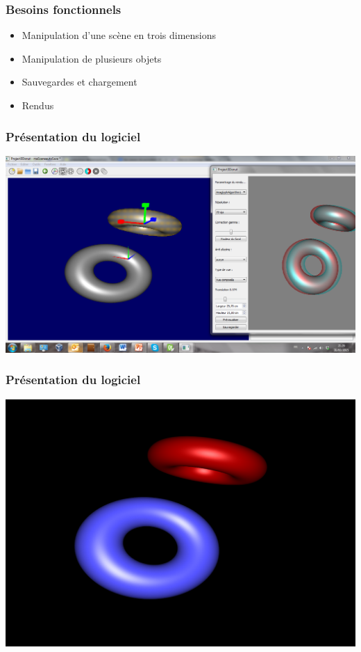 \documentclass{beamer}
\begin{document}
\begin{frame}
\frametitle{Besoins fonctionnels}
\begin{itemize}[label=$\bullet$]
\item Manipulation d'une scène en trois dimensions
\item Manipulation de plusieurs objets
\item Sauvegardes et chargement
\item Rendus
\end{itemize}
\end{frame}

\begin{frame}
\frametitle{Présentation du logiciel}
\includegraphics[scale=0.22]{logiciel.png}
\end{frame}

%
\begin{frame}
\frametitle{Présentation du logiciel}

\centering
\includegraphics[scale=0.3]{logiciel1.png}
\end{frame}
\end{document}
